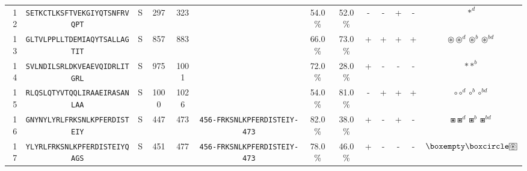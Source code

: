 \begin{tabular}{rcccccccccccc}
12 &  \texttt{SETKCTLKSFTVEKGIYQTSNFRVQPT} &       S &    297 &   323 &                                                                  &                          54.0\% &                           52.0\% &          - &           - &          + &           - &                                                                                                                                     $ \ast^d $ \\
13 &  \texttt{GLTVLPPLLTDEMIAQYTSALLAGTIT} &       S &    857 &   883 &                                                                  &                          66.0\% &                           73.0\% &          + &           + &          + &           + &                                                                                   $ \circledast \circledast^d \circledast^b \circledast^{bd} $ \\
14 &  \texttt{SVLNDILSRLDKVEAEVQIDRLITGRL} &       S &    975 &  1001 &                                                                  &                          72.0\% &                           28.0\% &          + &           - &          - &           - &                                                                                                                                $ \ast \ast^b $ \\
15 &  \texttt{RLQSLQTYVTQQLIRAAEIRASANLAA} &       S &   1000 &  1026 &                                                                  &                          54.0\% &                           81.0\% &          - &           + &          + &           + &                                                                                                           $ \circ \circ^d \circ^b \circ^{bd} $ \\
16 &  \texttt{GNYNYLYRLFRKSNLKPFERDISTEIY} &       S &    447 &   473 &  \texttt{{\scriptsize 456-}FRKSNLKPFERDISTEIY{\scriptsize -473}} &                          82.0\% &                           38.0\% &          + &           - &          + &           - &                                                                                                   $ \boxast \boxast^d \boxast^b \boxast^{bd} $ \\
17 &  \texttt{YLYRLFRKSNLKPFERDISTEIYQAGS} &       S &    451 &   477 &  \texttt{{\scriptsize 456-}FRKSNLKPFERDISTEIY{\scriptsize -473}} &                          78.0\% &                           46.0\% &          + &           - &          - &           - &                                                                       $ \boxempty \boxcircle \setlength{\fboxsep}{0.5pt} \boxed{\circledast} $ \\

\end{tabular}
